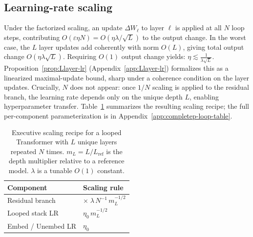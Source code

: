 \subsection{Learning-rate scaling}

Under the factorized scaling, an update $\Delta W_\ell$ to layer $\ell$ is applied at all $N$ loop steps, contributing $O(\varepsilon\eta N)=O(\eta\lambda/\!\sqrt{L})$ to the output change.
In the worst case, the $L$ layer updates add coherently with norm $O(L)$, giving total output change $O(\eta\lambda\sqrt{L})$.
Requiring $O(1)$ output change yields:
\(
  \eta \lesssim \frac{1}{\lambda\sqrt{L}}.
\)
Proposition~\ref{prop:Llayer-lr} (Appendix~\ref{app:Llayer-lr}) formalizes this as a linearized maximal-update bound, sharp under a coherence condition on the layer updates.
Crucially, $N$ does not appear: once $1/N$ scaling is applied to the residual branch, the learning rate depends only on the unique depth $L$, enabling hyperparameter transfer.
Table~\ref{tab:recipe} summarizes the resulting scaling recipe; the full per-component parameterization is in Appendix~\ref{app:completep-loop-table}.

\begin{table}[t]
\centering
\small
\begin{tabular}{@{}ll@{}}
\toprule
Component & Scaling rule \\
\midrule
Residual branch & $\times\;\lambda\,N^{-1}\,m_L^{-1/2}$ \\
Looped stack LR & $\eta_0\,m_L^{-1/2}$ \\
Embed / Unembed LR & $\eta_0$ \\
\bottomrule
\end{tabular}
\caption{
Executive scaling recipe for a looped Transformer with $L$ unique layers repeated $N$ times.
$m_L=L/L_{\mathrm{ref}}$ is the depth multiplier relative to a reference model. $\lambda$ is a tunable $O(1)$ constant.
}
\label{tab:recipe}
\vspace{-0.3cm}
\end{table}
